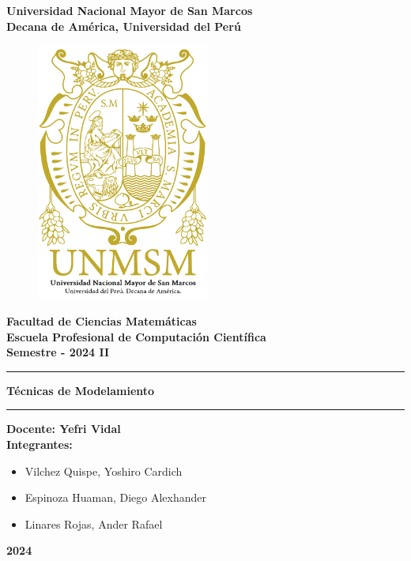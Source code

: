 \begin{titlepage}
  \rmfamily
  \begin{center}
  \LARGE\textbf{Universidad Nacional Mayor de San Marcos}\\
  \vspace{2.5mm}
  \large\textbf{Decana de América, Universidad del Perú}\\
  \vspace{2.5mm}
  \begin{figure}[H]
    \centering
    \includegraphics[height=8.5cm]{logo.png}
  \end{figure}
  \Large\textbf{Facultad de Ciencias Matemáticas}\\
  \vspace{2.5mm}
  \large\textbf{Escuela Profesional de Computación Científica}\\
  \vspace{2.5mm}
  \large\textbf{Semestre - 2024 II}\\
  \rule{\linewidth}{0.55mm}
  \Large\textbf{Técnicas de Modelamiento}\\
  \rule{\linewidth}{0.55mm}
  \large\textbf{Docente: Yefri Vidal}\\
  \vspace{2.5mm}
  \large\textbf{Integrantes:}\\
  \vspace{2.5mm}
  \begin{itemize}
    \normalsize
    \item Vilchez Quispe, Yoshiro Cardich 
    \item Espinoza Huaman, Diego Alexhander 
    \item Linares Rojas, Ander Rafael 
  \end{itemize}
  \vfill
  {\huge\textbf{2024}}
  \end{center}
\end{titlepage}
